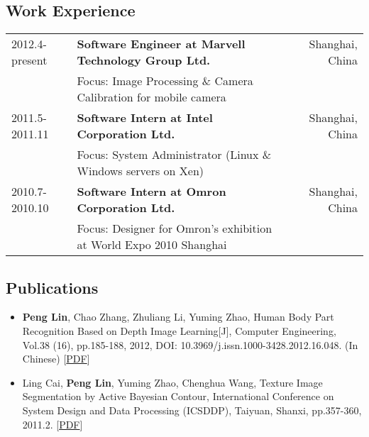\documentclass[10pt, a4paper]{article}
\begin{document}
\subsection*{Work Experience}
\label{sec-1-2}
\begin{center}
\begin{tabularx}{\linewidth}{lXr}
2012.4-present & \textbf{Software Engineer at Marvell Technology Group Ltd.} & Shanghai, China\\
 & Focus: Image Processing \& Camera Calibration for mobile camera & \\
2011.5-2011.11 & \textbf{Software Intern at Intel Corporation Ltd.} & Shanghai, China\\
 & Focus: System Administrator (Linux \& Windows servers on Xen) & \\
2010.7-2010.10 & \textbf{Software Intern at Omron Corporation Ltd.} & Shanghai, China\\
 & Focus: Designer for Omron's exhibition at World Expo 2010 Shanghai & \\
\end{tabularx}
\end{center}


\subsection*{Publications}
\label{sec-1-3}
\begin{itemize}
\item \textbf{Peng Lin}, Chao Zhang, Zhuliang Li, Yuming Zhao, Human Body Part
Recognition Based on Depth Image Learning[J], Computer Engineering, Vol.38
(16), pp.185-188, 2012, DOI: 10.3969/j.issn.1000-3428.2012.16.048. (In
Chinese) [\href{https://drive.google.com/viewerng/viewer?a=v&pid=sites&srcid=ZGVmYXVsdGRvbWFpbnxwZW5nbGluMDN8Z3g6MmZhYzU4NjM1NDlkMjg1Mw}{PDF}]
\item Ling Cai, \textbf{Peng Lin}, Yuming Zhao, Chenghua Wang, Texture Image
Segmentation by Active Bayesian Contour, International Conference on
System Design and Data Processing (ICSDDP), Taiyuan, Shanxi, pp.357-360,
2011.2. [\href{https://drive.google.com/viewerng/viewer?a=v&pid=sites&srcid=ZGVmYXVsdGRvbWFpbnxwZW5nbGluMDN8Z3g6NzYwYzEzZTViNGRmY2NjYg}{PDF}]
\end{itemize}
\end{document}
